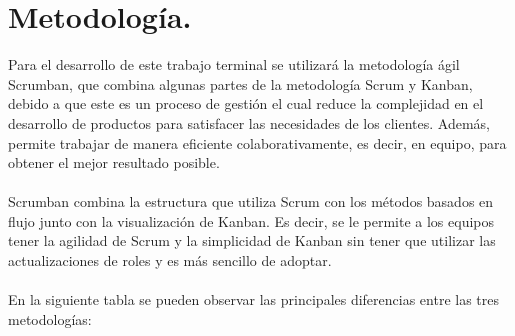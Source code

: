 \documentclass[12pt, a4paper, titlepage]{report}
\begin{document}
	    \section{Metodolog\'ia.}
	    Para el desarrollo de este trabajo terminal se utilizará la metodología ágil Scrumban, que combina algunas partes de la 
	    metodología Scrum y Kanban, debido a que este es un proceso de gestión el cual reduce la complejidad en el desarrollo de 
	    productos para satisfacer las necesidades de los clientes. Además, permite trabajar de manera eficiente colaborativamente, 
	    es decir, en equipo, para obtener el mejor resultado posible.\\\\
	    Scrumban combina la estructura que utiliza Scrum con los métodos basados en flujo junto con la visualización de Kanban.
	    Es decir, se le permite a los equipos tener la agilidad de Scrum y la simplicidad de Kanban sin tener que utilizar las 
	    actualizaciones de roles y es más sencillo de adoptar.\\\\
	    En la siguiente tabla se pueden observar las principales diferencias entre las tres metodologías:
	    
\end{document}
